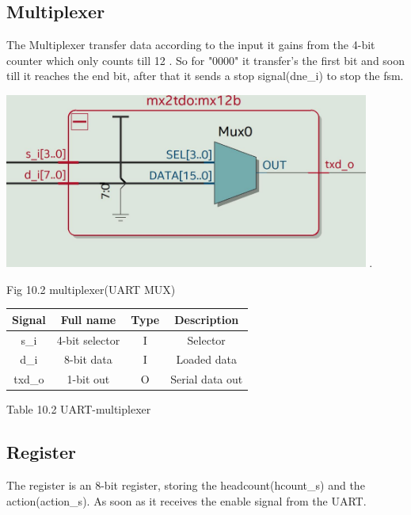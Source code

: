 \documentclass{article}
\begin{document}
\subsection{Multiplexer}
The Multiplexer transfer data according to the input it gains from the 4-bit counter which only counts till 12 . So for "0000" it transfer's the first bit and soon till it reaches the end bit, after that it sends a stop signal(dne\_i) to stop the fsm. 
\begin{center}

\includegraphics[width=12cm]{multiplexer.JPG}
.
\end{center}
Fig 10.2 multiplexer(UART MUX)
\vspace{1.5cm}
    \begin{center}
    \begin{tabular}{|c|c|c|c|}
        \hline 
        Signal  &  Full name & Type & Description \\
        \hline
        \hline
        s\_i &  4-bit selector & I &   Selector  \\ 
        \hline
        d\_i &  8-bit data & I &  Loaded data \\
        \hline 
        txd\_o &   1-bit out & O & Serial data out\\
        \hline 
        \end{tabular}
        \end{center}
        Table 10.2 UART-multiplexer
        

\newpage
\subsection{Register}

The register is an 8-bit register, storing the headcount(hcount\_s) and the action(action\_s). As soon as it receives the enable signal from the  UART.
\end{document}
